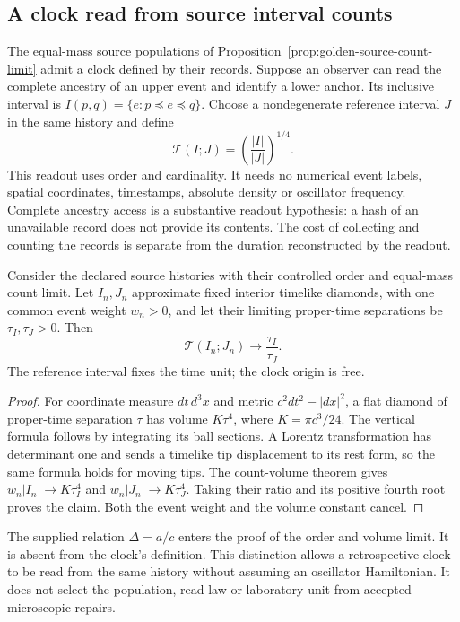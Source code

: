 \subsection{A clock read from source interval counts}
\label{sec:source-count-clock}

The equal-mass source populations of
Proposition~\ref{prop:golden-source-count-limit} admit a clock defined by
their records. Suppose an observer can read the complete ancestry of an
upper event and identify a lower anchor. Its inclusive interval is
$I(p,q)=\{e:p\preceq e\preceq q\}$. Choose a nondegenerate reference
interval $J$ in the same history and define
\begin{equation}
 \mathcal T(I;J)=\left(\frac{|I|}{|J|}\right)^{1/4}.
 \label{eq:source-count-clock}
\end{equation}
This readout uses order and cardinality. It needs no numerical event
labels, spatial coordinates, timestamps, absolute density or oscillator
frequency. Complete ancestry access is a substantive readout hypothesis:
a hash of an unavailable record does not provide its contents. The cost
of collecting and counting the records is separate from the duration
reconstructed by the readout.

\begin{theorem}
\label{thm:source-count-clock}
Consider the declared source histories with their controlled order and
equal-mass count limit. Let $I_n,J_n$ approximate fixed interior timelike
diamonds, with one common event weight $w_n>0$, and let their limiting
proper-time separations be $\tau_I,\tau_J>0$. Then
\[
 \mathcal T(I_n;J_n)\longrightarrow\frac{\tau_I}{\tau_J}.
\]
The reference interval fixes the time unit; the clock origin is free.
\end{theorem}
\begin{proof}
For coordinate measure $dt\,d^3x$ and metric $c^2dt^2-|dx|^2$, a flat
diamond of proper-time separation $\tau$ has volume
$K\tau^4$, where $K=\pi c^3/24$. The vertical formula follows by
integrating its ball sections. A Lorentz transformation has determinant
one and sends a timelike tip displacement to its rest form, so the same
formula holds for moving tips. The count-volume theorem gives
$w_n|I_n|\to K\tau_I^4$ and $w_n|J_n|\to K\tau_J^4$.
Taking their ratio and its positive fourth root proves the claim. Both
the event weight and the volume constant cancel.
\end{proof}

The supplied relation $\Delta=a/c$ enters the proof of the order and
volume limit. It is absent from the clock's definition. This distinction
allows a retrospective clock to be read from the same history without
assuming an oscillator Hamiltonian. It does not select the population,
read law or laboratory unit from accepted microscopic repairs.

